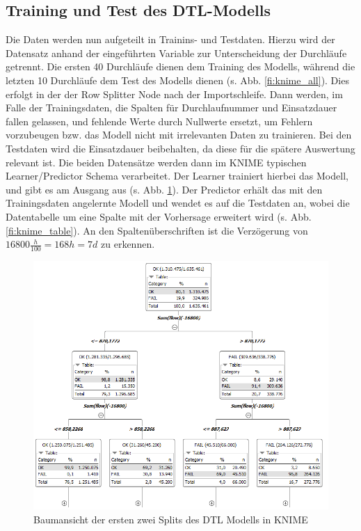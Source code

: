     \subsection{Training und Test des DTL-Modells}
    Die Daten werden nun aufgeteilt in Trainins- und Testdaten. Hierzu wird der Datensatz anhand der eingeführten Variable zur Unterscheidung der Durchläufe getrennt. Die ersten 40 Durchläufe dienen dem Training des Modells, während die letzten 10 Durchläufe dem Test des Modells dienen (s. Abb. \ref{fi:knime_all}). Dies erfolgt in der der Row Splitter Node nach der Importschleife. Dann werden, im Falle der Trainingsdaten, die Spalten für Durchlaufnummer und Einsatzdauer fallen gelassen, und fehlende Werte durch Nullwerte ersetzt, um Fehlern vorzubeugen bzw. das Modell nicht mit irrelevanten Daten zu trainieren. Bei den Testdaten wird die Einsatzdauer beibehalten, da diese für die spätere Auswertung relevant ist.
    Die beiden Datensätze werden dann im \ac{KNIME} typischen Learner/Predictor Schema verarbeitet. Der Learner trainiert hierbei das Modell, und gibt es am Ausgang aus (s. Abb. \ref{fi:knime_dtl}). Der Predictor erhält das mit den Trainingsdaten angelernte Modell und wendet es auf die Testdaten an, wobei die Datentabelle um eine Spalte mit der Vorhersage erweitert wird (s. Abb. \ref{fi:knime_table}). An den Spaltenüberschriften ist die Verzögerung von $16800 \frac{h}{100} = 168 h = 7 d $ zu erkennen.  \\
    \begin{figure}[H]
        \begin{center}
            \includegraphics[width=\linewidth]{images/knime_dtl.png}
            \caption[KNIME DTL Baum]{Baumansicht der ersten zwei Splits des DTL Modells in KNIME}
            \label{fi:knime_dtl}
        \end{center}
    \end{figure}
